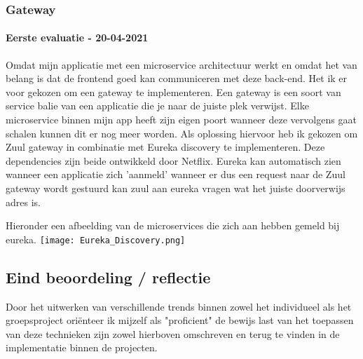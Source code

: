 \subsubsection{Gateway}\label{subsec:gateway}
\paragraph{Eerste evaluatie - 20-04-2021}
Omdat mijn applicatie met een microservice architectuur werkt en omdat het van belang is dat de frontend goed kan communiceren met deze back-end.
Het ik er voor gekozen om een gateway te implementeren.
Een gateway is een soort van service balie van een applicatie die je naar de juiste plek verwijst.
Elke microservice binnen mijn app heeft zijn eigen poort wanneer deze vervolgens gaat schalen kunnen dit er nog meer worden.
Als oplossing hiervoor heb ik gekozen om Zuul gateway in combinatie met Eureka discovery te implementeren.
Deze dependencies zijn beide ontwikkeld door Netflix.
Eureka kan automatisch zien wanneer een applicatie zich 'aanmeld' wanneer er dus een request naar de Zuul gateway
wordt gestuurd kan zuul aan eureka vragen wat het juiste doorverwijs adres is.

Hieronder een afbeelding van de microservices die zich aan hebben gemeld bij eureka.
\texttt{[image: Eureka\_Discovery.png]}\label{fig:eureka_discovery}


\subsection{Eind beoordeling / reflectie}
Door het uitwerken van verschillende trends binnen zowel het individueel als het groepsproject oriënteer ik mijzelf
als "proficient" de bewijs last van het toepassen van deze technieken zijn zowel hierboven omschreven en terug te
vinden in de implementatie binnen de projecten.

\newpage
